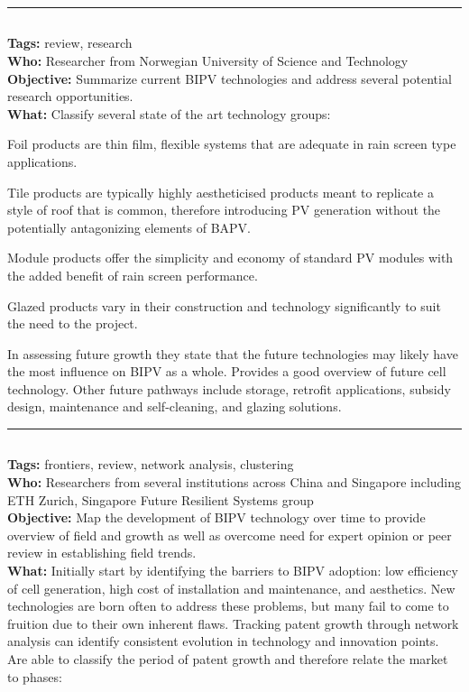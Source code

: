 \documentclass[11pt,a4paper]{article}
\newenvironment{itemize*}%
  {\begin{itemize}[rightmargin=\dimexpr\linewidth-120mm-\leftmargin\relax]%
    \setlength{\itemsep}{0pt}%
    \setlength{\parskip}{0pt}}%
  {\end{itemize}}
\begin{document}
\noindent\rule{\textwidth}{1pt}
\subsection*{}
\textbf{Tags:} review, research \\
\textbf{Who:} Researcher from Norwegian University of Science and Technology \\
\textbf{Objective:} Summarize current BIPV technologies and address several potential research opportunities. \\
\textbf{What:} Classify several state of the art technology groups:

\begin{itemize*}
    \item Foil products are thin film, flexible systems that are adequate in rain screen type applications.
    \item Tile products are typically highly aestheticised products meant to replicate a style of roof that is common, therefore introducing PV generation without the potentially antagonizing elements of BAPV.
    \item Module products offer the simplicity and economy of standard PV modules with the added benefit of rain screen performance.
    \item Glazed products vary in their construction and technology significantly to suit the need to the project. 
\end{itemize*}

In assessing future growth they state that the future technologies may likely have the most influence on BIPV as a whole. Provides a good overview of future cell technology. Other future pathways include storage, retrofit applications, subsidy design, maintenance and self-cleaning, and glazing solutions. 

\noindent\rule{\textwidth}{1pt}
\subsection*{}
\textbf{Tags:} frontiers, review, network analysis, clustering \\
\textbf{Who:} Researchers from several institutions across China and Singapore including ETH Zurich, Singapore Future Resilient Systems group \\
\textbf{Objective:} Map the development of BIPV technology over time to provide overview of field and growth as well as overcome need for expert opinion or peer review in establishing field trends. \\
\textbf{What:} Initially start by identifying the barriers to BIPV adoption: low efficiency of cell generation, high cost of installation and maintenance, and aesthetics. New technologies are born often to address these problems, but many fail to come to fruition due to their own inherent flaws. Tracking patent growth through network analysis can identify consistent evolution in technology and innovation points. Are able to classify the period of patent growth and therefore relate the market to phases:
\end{document}
